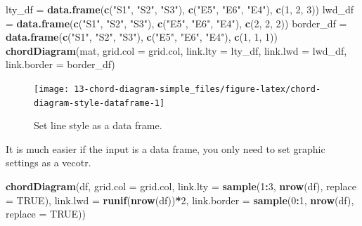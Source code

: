 \documentclass[]{book}
\newenvironment{Shaded}{\begin{snugshade}}{\end{snugshade}}
\newcommand{\KeywordTok}[1]{\textcolor[rgb]{0.13,0.29,0.53}{\textbf{#1}}}
\newcommand{\DataTypeTok}[1]{\textcolor[rgb]{0.13,0.29,0.53}{#1}}
\newcommand{\DecValTok}[1]{\textcolor[rgb]{0.00,0.00,0.81}{#1}}
\newcommand{\StringTok}[1]{\textcolor[rgb]{0.31,0.60,0.02}{#1}}
\newcommand{\OtherTok}[1]{\textcolor[rgb]{0.56,0.35,0.01}{#1}}
\newcommand{\OperatorTok}[1]{\textcolor[rgb]{0.81,0.36,0.00}{\textbf{#1}}}
\newcommand{\NormalTok}[1]{#1}
\begin{document}
\begin{Shaded}
\begin{Highlighting}[]
\NormalTok{lty_df =}\StringTok{ }\KeywordTok{data.frame}\NormalTok{(}\KeywordTok{c}\NormalTok{(}\StringTok{"S1"}\NormalTok{, }\StringTok{"S2"}\NormalTok{, }\StringTok{"S3"}\NormalTok{), }\KeywordTok{c}\NormalTok{(}\StringTok{"E5"}\NormalTok{, }\StringTok{"E6"}\NormalTok{, }\StringTok{"E4"}\NormalTok{), }\KeywordTok{c}\NormalTok{(}\DecValTok{1}\NormalTok{, }\DecValTok{2}\NormalTok{, }\DecValTok{3}\NormalTok{))}
\NormalTok{lwd_df =}\StringTok{ }\KeywordTok{data.frame}\NormalTok{(}\KeywordTok{c}\NormalTok{(}\StringTok{"S1"}\NormalTok{, }\StringTok{"S2"}\NormalTok{, }\StringTok{"S3"}\NormalTok{), }\KeywordTok{c}\NormalTok{(}\StringTok{"E5"}\NormalTok{, }\StringTok{"E6"}\NormalTok{, }\StringTok{"E4"}\NormalTok{), }\KeywordTok{c}\NormalTok{(}\DecValTok{2}\NormalTok{, }\DecValTok{2}\NormalTok{, }\DecValTok{2}\NormalTok{))}
\NormalTok{border_df =}\StringTok{ }\KeywordTok{data.frame}\NormalTok{(}\KeywordTok{c}\NormalTok{(}\StringTok{"S1"}\NormalTok{, }\StringTok{"S2"}\NormalTok{, }\StringTok{"S3"}\NormalTok{), }\KeywordTok{c}\NormalTok{(}\StringTok{"E5"}\NormalTok{, }\StringTok{"E6"}\NormalTok{, }\StringTok{"E4"}\NormalTok{), }\KeywordTok{c}\NormalTok{(}\DecValTok{1}\NormalTok{, }\DecValTok{1}\NormalTok{, }\DecValTok{1}\NormalTok{))}
\KeywordTok{chordDiagram}\NormalTok{(mat, }\DataTypeTok{grid.col =}\NormalTok{ grid.col, }\DataTypeTok{link.lty =}\NormalTok{ lty_df, }\DataTypeTok{link.lwd =}\NormalTok{ lwd_df,}
    \DataTypeTok{link.border =}\NormalTok{ border_df)}
\end{Highlighting}
\end{Shaded}

\begin{figure}

{\centering \texttt{[image: 13-chord-diagram-simple\_files/figure-latex/chord-diagram-style-dataframe-1]} 

}

\caption{Set line style as a data frame.}\label{fig:chord-diagram-style-dataframe}
\end{figure}

It is much easier if the input is a data frame, you only need to set
graphic settings as a vecotr.

\begin{Shaded}
\begin{Highlighting}[]
\KeywordTok{chordDiagram}\NormalTok{(df, }\DataTypeTok{grid.col =}\NormalTok{ grid.col, }\DataTypeTok{link.lty =} \KeywordTok{sample}\NormalTok{(}\DecValTok{1}\OperatorTok{:}\DecValTok{3}\NormalTok{, }\KeywordTok{nrow}\NormalTok{(df), }\DataTypeTok{replace =} \OtherTok{TRUE}\NormalTok{),}
    \DataTypeTok{link.lwd =} \KeywordTok{runif}\NormalTok{(}\KeywordTok{nrow}\NormalTok{(df))}\OperatorTok{*}\DecValTok{2}\NormalTok{, }\DataTypeTok{link.border =} \KeywordTok{sample}\NormalTok{(}\DecValTok{0}\OperatorTok{:}\DecValTok{1}\NormalTok{, }\KeywordTok{nrow}\NormalTok{(df), }\DataTypeTok{replace =} \OtherTok{TRUE}\NormalTok{))}
\end{Highlighting}
\end{Shaded}
\end{document}
